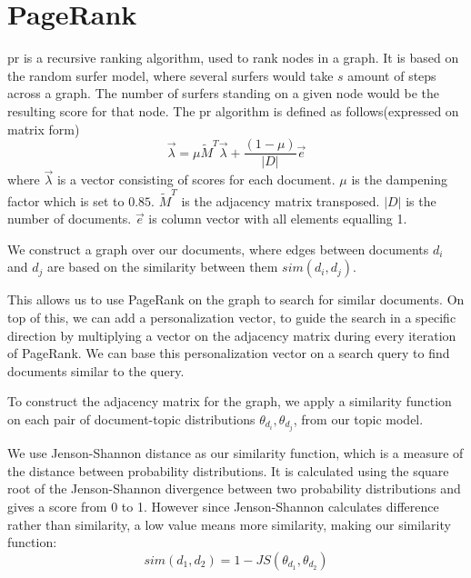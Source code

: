 \section{PageRank}\label{sec:pagerank}
\gls{pr} is a recursive ranking algorithm, used to rank nodes in a graph.
It is based on the random surfer model, where several surfers would take $s$ amount of steps across a graph.
The number of surfers standing on a given node would be the resulting score for that node.
The \gls{pr} algorithm is defined as follows(expressed on matrix form)
$$ \overrightarrow{\lambda} = \mu \widetilde{M}^T \overrightarrow{\lambda} + \frac{(1-\mu)}{|D|} \overrightarrow{e} $$  
where $\overrightarrow{\lambda}$ is a vector consisting of scores for each document. 
$\mu$ is the dampening factor which is set to $0.85$.
$\widetilde{M}^T$ is the adjacency matrix transposed.
$|D|$ is the number of documents.
$\overrightarrow{e}$ is column vector with all elements equalling 1.

We construct a graph over our documents, where edges between documents $d_i$ and $d_j$ are based on the similarity between them $sim(d_i, d_j)$.

This allows us to use PageRank on the graph to search for similar documents.
On top of this, we can add a personalization vector, to guide the search in a specific direction by multiplying a vector on the adjacency matrix during every iteration of PageRank.
We can base this personalization vector on a search query to find documents similar to the query.

To construct the adjacency matrix for the graph, we apply a similarity function on each pair of document-topic distributions $\theta_{d_i}, \theta_{d_j}$, from our topic model.

We use Jenson-Shannon distance as our similarity function, which is a measure of the distance between probability distributions\cite{jensen-shannon2003}\cite{jensen-shannondis2003}.
It is calculated using the square root of the Jenson-Shannon divergence between two probability distributions and gives a score from 0 to 1.
However since Jenson-Shannon calculates difference rather than similarity, a low value means more similarity, making our similarity function:
$$sim(d_1, d_2) = 1 - JS(\theta_{d_1}, \theta_{d_2})$$


